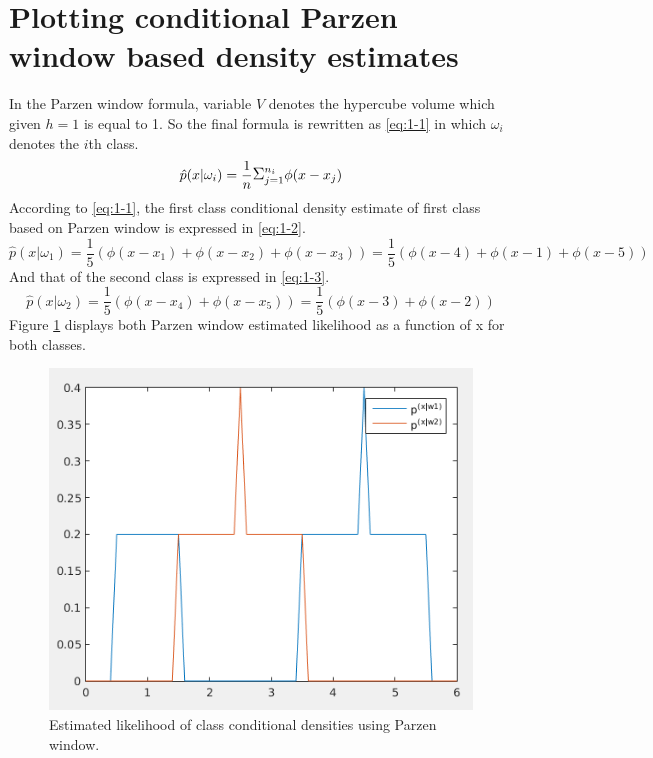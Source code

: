 \documentclass[12pt]{article}
\begin{document}

\tableofcontents
\pagebreak
\listoffigures
\pagebreak
\listoftables
\lstlistoflistings
\pagebreak

\section{Plotting conditional Parzen window based density estimates}
In the Parzen window formula, variable $V$ denotes the hypercube volume which given $h = 1$ is equal to 1. So the final formula is rewritten as \eqref{eq:1-1} in which $\omega_i$ denotes the $i$th class.
\begin{equation}
\hat{p}(x|\omega_i) = \frac{1}{n}\mathlarger{\Sigma}_{j=1}^{n_i} \phi(x - x_j)
\label{eq:1-1}
\end{equation}
According to \eqref{eq:1-1}, the first class conditional density estimate of first class based on Parzen window is expressed in \eqref{eq:1-2}.
\begin{equation}
\hat{p}(x|\omega_1) = \frac{1}{5}(\phi(x - x_1) + \phi(x - x_2) + \phi(x - x_3)) =  \frac{1}{5}(\phi(x - 4) + \phi(x - 1) + \phi(x - 5))
\label{eq:1-2}
\end{equation}
And that of the second class is expressed in \eqref{eq:1-3}.
\begin{equation}
\hat{p}(x|\omega_2) = \frac{1}{5}(\phi(x - x_4) + \phi(x - x_5)) =  \frac{1}{5}(\phi(x - 3) + \phi(x - 2))
\label{eq:1-3}
\end{equation}
Figure \ref{fig:1-1} displays both Parzen window estimated likelihood as a function of x for both classes.
\begin{figure}[h]
\centering
\includegraphics[scale=0.4]{Imgs/1-1.png}
\caption{Estimated likelihood of class conditional densities using Parzen window.}
\label{fig:1-1}
\end{figure}
\end{document}
